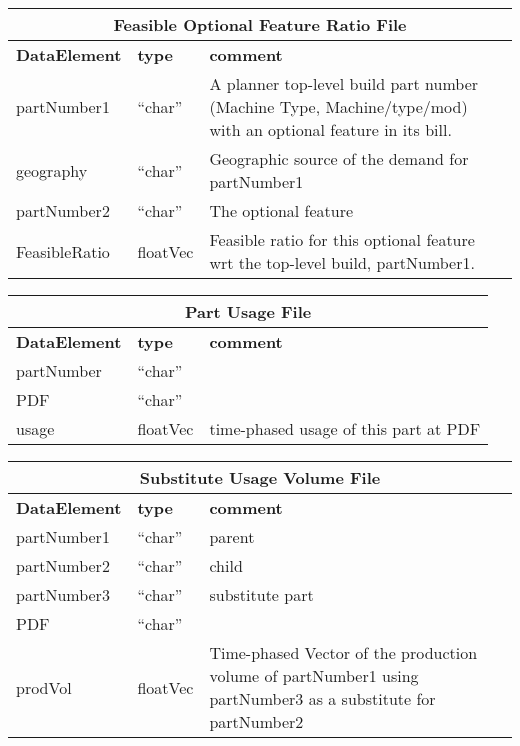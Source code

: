 \begin{tabular}{llp{4in}}
\multicolumn{3}{c}{{\bf Feasible Optional Feature Ratio File}}\\ \hline\hline
{\bf DataElement} &  {\bf type}  &   {\bf comment} \\ \hline
partNumber1  & ``char'' &       A planner top-level build part number 
                            (Machine Type, Machine/type/mod)
                            with an optional feature in its bill.  \\
geography    & ``char'' &      Geographic source of the demand for partNumber1 \\
partNumber2  & ``char'' &      The optional feature \\

FeasibleRatio    & floatVec &   Feasible ratio for this optional feature wrt
                        the top-level build, partNumber1. \\
\end{tabular}

\vspace{.5in}

\begin{tabular}{llp{4in}}
\multicolumn{3}{c}{{\bf Part Usage File}}\\ \hline\hline
{\bf DataElement} &  {\bf type}  &   {\bf comment} \\ \hline
partNumber &  ``char''     \\ 
PDF   & ``char''  \\
usage          & floatVec &  time-phased usage of this part at PDF\\
\end{tabular}

\vspace{.5in}

\begin{tabular}{llp{4in}}
\multicolumn{3}{c}{{\bf Substitute Usage Volume File}}\\ \hline\hline
{\bf DataElement} &  {\bf type}  &   {\bf comment} \\ \hline
partNumber1 & ``char''  & parent\\
partNumber2 & ``char''  & child \\
partNumber3 & ``char''  & substitute part\\
PDF        & ``char''  \\
prodVol    & floatVec &  Time-phased Vector of the production volume of
                      partNumber1 using partNumber3 as a substitute for
                      partNumber2 \\
\end{tabular}

